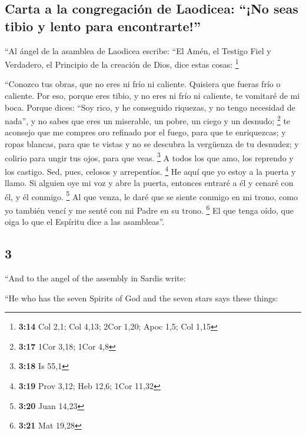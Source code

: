 \begin{paracol}{2}
\hypertarget{carta-a-la-congregaciuxf3n-de-laodicea-no-seas-tibio-y-lento-para-encontrarte}{%
\subsection{Carta a la congregación de Laodicea: ``¡No seas tibio y
lento para
encontrarte!''}\label{carta-a-la-congregaciuxf3n-de-laodicea-no-seas-tibio-y-lento-para-encontrarte}}

 ``Al ángel de la asamblea de Laodicea escribe: ``El
Amén, el Testigo Fiel y Verdadero, el Principio de la creación de Dios,
dice estas cosas: \footnote{\textbf{3:14} Col 2,1; Col 4,13; 2Cor 1,20;
  Apoc 1,5; Col 1,15}

 ``Conozco tus obras, que no eres ni frío ni caliente.
Quisiera que fueras frío o caliente.  Por eso, porque
eres tibio, y no eres ni frío ni caliente, te vomitaré de mi boca.
 Porque dices: ``Soy rico, y he conseguido riquezas, y no
tengo necesidad de nada'', y no sabes que eres un miserable, un pobre,
un ciego y un desnudo; \footnote{\textbf{3:17} 1Cor 3,18; 1Cor 4,8}
 te aconsejo que me compres oro refinado por el fuego,
para que te enriquezcas; y ropas blancas, para que te vistas y no se
descubra la vergüenza de tu desnudez; y colirio para ungir tus ojos,
para que veas. \footnote{\textbf{3:18} Is 55,1}  A todos
los que amo, los reprendo y los castigo. Sed, pues, celosos y
arrepentíos. \footnote{\textbf{3:19} Prov 3,12; Heb 12,6; 1Cor 11,32}
 He aquí que yo estoy a la puerta y llamo. Si alguien oye
mi voz y abre la puerta, entonces entraré a él y cenaré con él, y él
conmigo. \footnote{\textbf{3:20} Juan 14,23}  Al que
venza, le daré que se siente conmigo en mi trono, como yo también vencí
y me senté con mi Padre en su trono. \footnote{\textbf{3:21} Mat 19,28}
 El que tenga oído, que oiga lo que el Espíritu dice a
las asambleas''.

\switchcolumn
\begin{otherlanguage}{english}

\hypertarget{section-5}{%
\section{3}\label{section-5}}

 ``And to the angel of the assembly in Sardis write:

``He who has the seven Spirits of God and the seven stars says these
things:


\end{otherlanguage}
\end{paracol}
